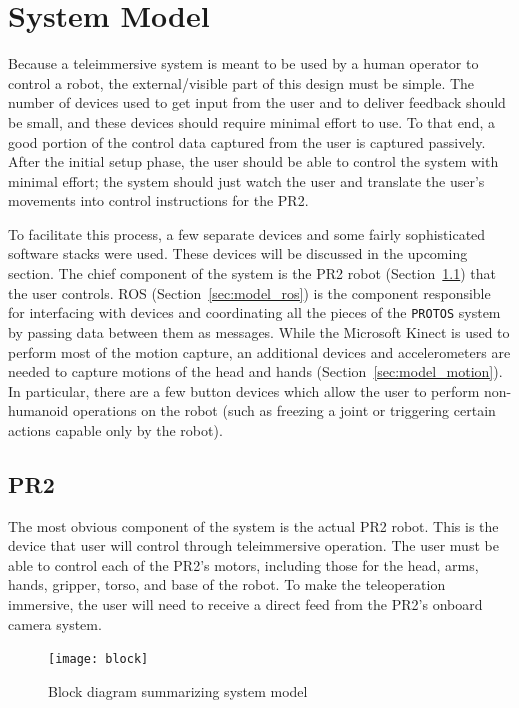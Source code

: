 \documentclass{sig-alternate}
\begin{document}
\section{System Model}
\label{sec:system_model}
Because a teleimmersive system is meant to be used by a human 
operator to control a robot, the external/visible part of this
design must be simple. The number of devices used to get input from the user 
and to deliver feedback should be small, and these devices should require
minimal effort to use. To that
end, a good portion of the control data captured from the user is captured
passively. After the initial setup phase, the user should be able to control
the system with minimal effort; the system should just watch the user and
translate the user's movements into control instructions for the PR2.

To facilitate this process, a few separate devices and some
fairly sophisticated software stacks were used. These devices will be discussed
in the upcoming section. The chief component of the system is the PR2 robot (Section~\ref{sec:model_PR2}) that
the user controls. ROS (Section~\ref{sec:model_ros}) is the component responsible for interfacing with devices and coordinating all the pieces of the
{\tt PROTOS} system by passing data between them as messages. While the
Microsoft Kinect is used to perform most of the motion capture, an additional
devices and accelerometers are needed to capture motions of the head and hands (Section~\ref{sec:model_motion}). 
In particular, there are a few button devices which allow the user to
perform non-humanoid operations on the robot (such as freezing a joint or
triggering certain actions capable only by the robot).

\subsection{PR2}
\label{sec:model_PR2}
The most obvious component of the system is the actual PR2 robot. This is the
device that user will control through teleimmersive operation. The user must
be able to control each of the PR2's motors, including those for the head,
arms, hands, gripper, torso, and base of the robot. To make the teleoperation
immersive, the user will need to receive a direct feed from the PR2's onboard
camera system.

\begin{figure}[htb] 
	\begin{center}
		\texttt{[image: block]}
	\end{center}
	\caption{Block diagram summarizing system model}
	\label{fig:some_graph}
\end{figure}
\end{document}
